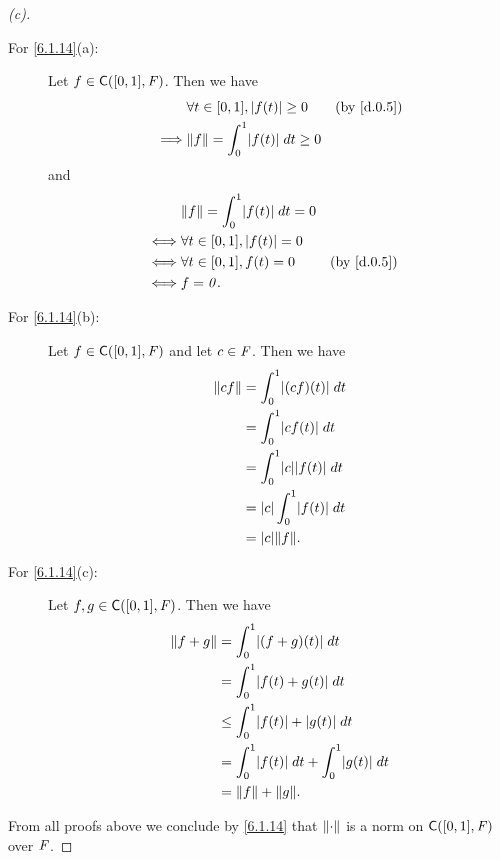 \begin{proof}[(c)]
  \begin{description}
    \item[For \cref{6.1.14}(a):]
      Let \(f \in \cfs([0, 1], \F)\).
      Then we have
      \begin{align*}
                 & \forall t \in [0, 1], \abs{f(t)} \geq 0     &  & \by{d.0.5} \\
        \implies & \norm{f} = \int_0^1 \abs{f(t)} \; dt \geq 0
      \end{align*}
      and
      \begin{align*}
             & \norm{f} = \int_0^1 \abs{f(t)} \; dt = 0                 \\
        \iff & \forall t \in [0, 1], \abs{f(t)} = 0                     \\
        \iff & \forall t \in [0, 1], f(t) = 0           &  & \by{d.0.5} \\
        \iff & f = \zv.
      \end{align*}
    \item[For \cref{6.1.14}(b):]
      Let \(f \in \cfs([0, 1], \F)\) and let \(c \in \mathit{F}\).
      Then we have
      \begin{align*}
        \norm{cf} & = \int_0^1 \abs{(cf)(t)} \; dt      \\
                  & = \int_0^1 \abs{cf(t)} \; dt        \\
                  & = \int_0^1 \abs{c} \abs{f(t)} \; dt \\
                  & = \abs{c} \int_0^1 \abs{f(t)} \; dt \\
                  & = \abs{c} \norm{f}.
      \end{align*}
    \item[For \cref{6.1.14}(c):]
      Let \(f, g \in \cfs([0, 1], \F)\).
      Then we have
      \begin{align*}
        \norm{f + g} & = \int_0^1 \abs{(f + g)(t)} \; dt                       \\
                     & = \int_0^1 \abs{f(t) + g(t)} \; dt                      \\
                     & \leq \int_0^1 \abs{f(t)} + \abs{g(t)} \; dt             \\
                     & = \int_0^1 \abs{f(t)} \; dt + \int_0^1 \abs{g(t)} \; dt \\
                     & = \norm{f} + \norm{g}.
      \end{align*}
  \end{description}
  From all proofs above we conclude by \cref{6.1.14} that \(\left\lVert\cdot\right\rVert\) is a norm on \(\cfs([0, 1], \F)\) over \(\mathit{F}\).
\end{proof}

